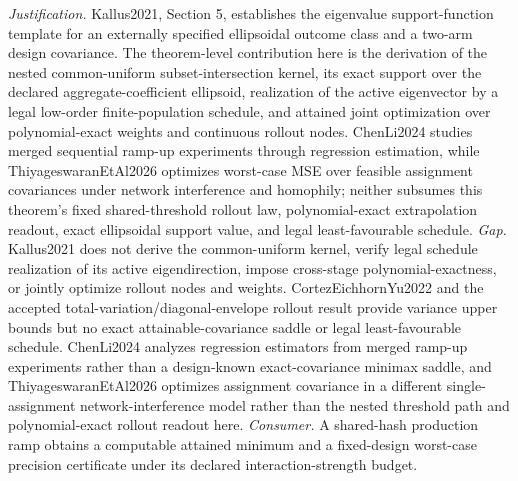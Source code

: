 \documentclass{article}
\begin{document}
\par\smallskip\noindent \textit{Justification.} Kallus2021, Section 5, establishes the eigenvalue support-function template for an externally specified ellipsoidal outcome class and a two-arm design covariance. The theorem-level contribution here is the derivation of the nested common-uniform subset-intersection kernel, its exact support over the declared aggregate-coefficient ellipsoid, realization of the active eigenvector by a legal low-order finite-population schedule, and attained joint optimization over polynomial-exact weights and continuous rollout nodes. ChenLi2024 studies merged sequential ramp-up experiments through regression estimation, while ThiyageswaranEtAl2026 optimizes worst-case MSE over feasible assignment covariances under network interference and homophily; neither subsumes this theorem's fixed shared-threshold rollout law, polynomial-exact extrapolation readout, exact ellipsoidal support value, and legal least-favourable schedule. \textit{Gap.} Kallus2021 does not derive the common-uniform kernel, verify legal schedule realization of its active eigendirection, impose cross-stage polynomial-exactness, or jointly optimize rollout nodes and weights. CortezEichhornYu2022 and the accepted total-variation/diagonal-envelope rollout result provide variance upper bounds but no exact attainable-covariance saddle or legal least-favourable schedule. ChenLi2024 analyzes regression estimators from merged ramp-up experiments rather than a design-known exact-covariance minimax saddle, and ThiyageswaranEtAl2026 optimizes assignment covariance in a different single-assignment network-interference model rather than the nested threshold path and polynomial-exact rollout readout here. \textit{Consumer.} A shared-hash production ramp obtains a computable attained minimum and a fixed-design worst-case precision certificate under its declared interaction-strength budget.
\end{document}
